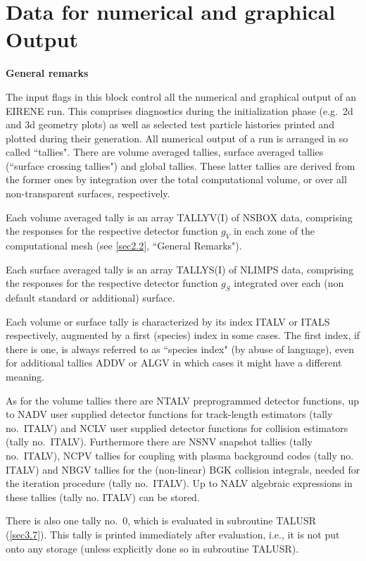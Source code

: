 \section{Data for numerical and graphical Output} \label{sec2.11}

\textbf{General remarks} 

\medskip 

The input flags in this block control all the numerical and graphical output of
an EIRENE run.
%
This comprises diagnostics during the initialization phase (e.g.\ 2d and 3d
geometry plots) as well as selected test particle histories printed and plotted
during their generation.
All numerical output of a run is arranged in so called ``tallies".
There are volume averaged tallies, surface averaged tallies (``surface crossing
tallies") and global tallies.
These latter tallies are derived from the former ones by integration over the
total computational volume, or over all non-transparent surfaces, respectively.

Each volume averaged tally is an array TALLYV(I) of NSBOX data, comprising the
responses for the respective detector function $g_V $ in each zone of the
computational mesh (see \cref{sec2.2}, ``General Remarks").

Each surface averaged tally is an array TALLYS(I) of NLIMPS data, comprising
the responses for the respective detector function $g_S $ integrated over each
(non default standard or additional) surface.

Each volume or surface tally is characterized by its index ITALV or ITALS
respectively, augmented by a first (species) index in some cases.
The first index, if there is one, is always referred to as ``species index" (by
abuse of language), even for additional tallies ADDV or ALGV in which cases it
might have a different meaning.

As for the volume tallies there are NTALV preprogrammed detector functions, up
to NADV user supplied detector functions for track-length estimators (tally
no.\ ITALV) and NCLV user supplied detector functions for collision estimators
(tally no.\ ITALV).
Furthermore there are NSNV snapshot tallies (tally no.\ ITALV), NCPV tallies
for coupling with plasma background codes (tally no.
ITALV) and NBGV tallies for the (non-linear) \ac{BGK} collision integrals,
needed for the iteration procedure (tally no.\ ITALV).
Up to NALV algebraic expressions in these tallies (tally no.
ITALV) can be stored.

There is also one tally no.\ 0, which is evaluated in subroutine TALUSR
(\cref{sec3.7}).
This tally is printed immediately after evaluation, i.e., it is not put onto
any storage (unless explicitly done so in subroutine TALUSR).

